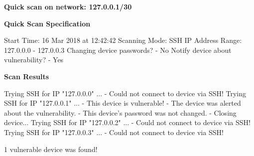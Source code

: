 {\Large{\textbf{Quick scan on network: 127.0.0.1/30}}}

\vspace{0.5cm}

\textbf{Quick Scan Specification}

\vspace{0.5cm}

Start Time: 16 Mar 2018 at 12:42:42
Scanning Mode: SSH
IP Address Range: 127.0.0.0 - 127.0.0.3
Changing device passwords? - No
Notify device about vulnerability? - Yes

\vspace{0.5cm}

\textbf{Scan Results}

\vspace{0.5cm}

Trying SSH for IP "127.0.0.0" ...
- Could not connect to device via SSH!
Trying SSH for IP "127.0.0.1" ...
- This device is vulnerable!
- The device was alerted about the vulnerability.
- This device's password was not changed.
- Closing device...
Trying SSH for IP "127.0.0.2" ...
- Could not connect to device via SSH!
Trying SSH for IP "127.0.0.3" ...
- Could not connect to device via SSH!

\vspace{0.5cm}

1 vulnerable device was found!

